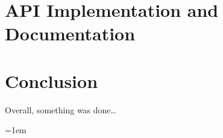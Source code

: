 \documentclass[12pt]{report}
\begin{document}



\chapter{API Implementation and Documentation}


\chapter*{Conclusion}

Overall, something was done\dots



\emergencystretch=1em

\printbibliography
{}



\end{document}
